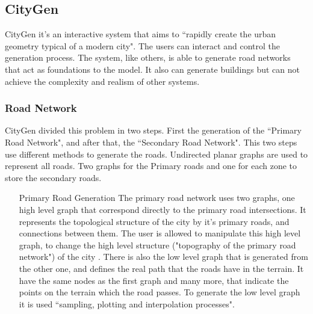 
\subsection{CityGen } %
\label{sec:citygen}


CityGen \cite{Kelly2008} it's an interactive system that aims  to ``rapidly create the urban geometry typical of a modern city". The users can interact and control the generation process. The system, like others, is able to generate road networks that act as foundations to the model. It also can generate buildings but can not achieve the complexity and realism of other systems.


\subsubsection{Road Network} %
\label{ssub:road_network}


CityGen divided this problem in two steps. First the generation of the ``Primary Road Network", and after that, the ``Secondary Road Network". This two steps use different methods to generate the roads.
Undirected planar graphs are used to represent all roads. Two graphs for the Primary roads and one for each zone to store the secondary roads.


\begin{itemize}
	\item[Primary Road Generation] The primary road network uses two graphs, one high level graph that correspond directly to the primary road intersections. It represents the topological structure of the city by it's primary roads, and connections between them. The user is allowed to manipulate this high level graph, to change the high level structure ("topography of the primary road network") of the city .
There is also the low level graph that is generated from the other one, and defines the real path that the roads have in the terrain. It have the same nodes as the first graph and many more, that indicate the points on the terrain which the road passes.
To generate the low level graph it is used ``sampling, plotting and interpolation processes".
\end{itemize}

	

